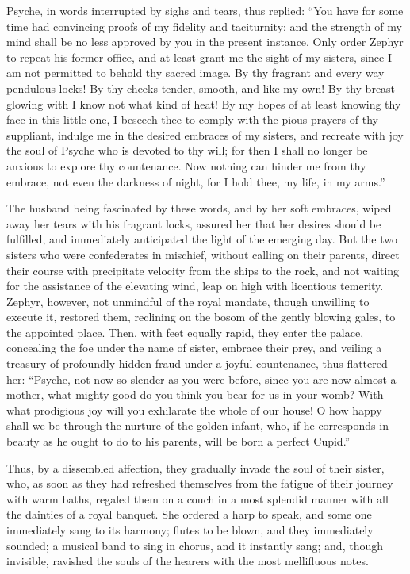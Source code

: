 \documentclass{article}
\begin{document}
Psyche, in words interrupted by sighs and tears, thus replied: ``You have for
some time had convincing proofs of my fidelity and taciturnity; and the
strength of my mind shall be no less approved by you in the present instance.
Only order Zephyr to repeat his former office, and at least grant me the sight
of my sisters, since I am not permitted to behold thy sacred image. By thy
fragrant and every way pendulous locks! By thy cheeks tender, smooth, and like
my own! By thy breast glowing with I know not what kind of heat! By my hopes of
at least knowing thy face in this little one, I beseech thee to comply with the
pious prayers of thy suppliant, indulge me in the desired embraces of my
sisters, and recreate with joy the soul of Psyche who is devoted to thy will;
for then I shall no longer be anxious to explore thy countenance. Now nothing
can hinder me from thy embrace, not even the darkness of night, for I hold
thee, my life, in my arms.''

The husband being fascinated by these words, and by her soft embraces, wiped
away her tears with his fragrant locks, assured her that her desires should be
fulfilled, and immediately anticipated the light of the emerging day. But the
two sisters who were confederates in mischief, without calling on their
parents, direct their course with precipitate velocity from the ships to the
rock, and not waiting for the assistance of the elevating wind, leap on high
with licentious temerity. Zephyr, however, not unmindful of the royal mandate,
though unwilling to execute it, restored them, reclining on the bosom of the
gently blowing gales, to the appointed place. Then, with feet equally rapid,
they enter the palace, concealing the foe under the name of sister, embrace
their prey, and veiling a treasury of profoundly hidden fraud under a joyful
countenance, thus flattered her: ``Psyche, not now so slender as you were
before, since you are now almost a mother, what mighty good do you think you
bear for us in your womb? With what prodigious joy will you exhilarate the
whole of our house! O how happy shall we be through the nurture of the golden
infant, who, if he corresponds in beauty as he ought to do to his parents, will
be born a perfect Cupid.''

Thus, by a dissembled affection, they gradually invade the soul of their
sister, who, as soon as they had refreshed themselves from the fatigue of their
journey with warm baths, regaled them on a couch in a most splendid manner with
all the dainties of a royal banquet. She ordered a harp to speak, and some one
immediately sang to its harmony; flutes to be blown, and they immediately
sounded; a musical band to sing in chorus, and it instantly sang; and, though
invisible, ravished the souls of the hearers with the most mellifluous notes.
\end{document}
